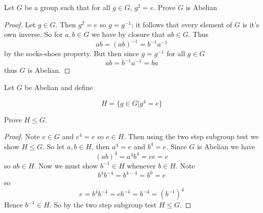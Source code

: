 \documentclass[11pt,largemargins]{homework}
\begin{document}
\maketitle

\question
Let $G$ be a group such that for all $g \in G$, $g^2 = e$. Prove $G$ is Abelian

\begin{proof}
    Let $g \in G$. Then $g^2 = e$ so $g = g^{-1}$; it follows that 
    every element of $G$ is it's own inverse. So for $a, b \in G$ we have 
    by closure that $ab \in G$. Thus 
    \[ ab = (ab)^{-1} = b^{-1}a^{-1} \]
    by the socks-shoes property. But then since $g = g^{-1}$ for all $g \in G$
    \[ab = b^{-1}a^{-1} = ba \]
    thus $G$ is Abelian. 
\end{proof}

\question
Let $G$ be Abelian and define 

\[H = \{ g \in G | g^4 = e \}\] 

Prove $H \leq G$. 

\begin{proof}
    Note $e \in G$ and $e^4 = e$ so $e \in H$. Then using the two step subgroup test we show $H \leq G$. 
    So let $a, b \in H$, then $a^4 = e$ and $b^4 = e$. Since $G$ is Abelian we have 
    \[ (ab)^4 = a^4b^4 = ee = e \] 
    so $ab \in H$. Now we must show $b^{-1} \in H$ whenever $b \in H$. Note 
    \[b^4b^{-4} = b^{4-4} = b^0 = e \]
    so 
    \[e = b^4b^{-4} = eb^{-4} = b^{-4} = (b^{-1})^4\] 
    Hence $b^{-1} \in H$. So by the two step subgroup test $H \leq G$. 
\end{proof}
\end{document}
